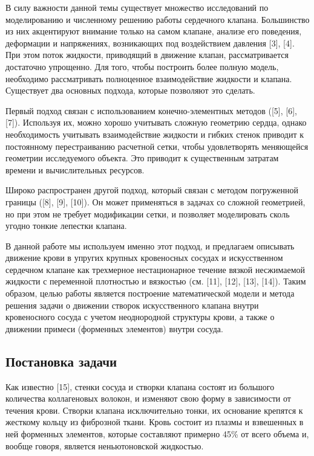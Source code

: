 В силу важности данной темы существует множество исследований по
моделированию и численному решению работы сердечного клапана.
Большинство из них акцентируют внимание только на самом клапане, анализе
его поведения, деформации и напряжениях, возникающих под воздействием
давления {[}3{]}, {[}4{]}. При этом поток жидкости, приводящий в
движение клапан, рассматривается достаточно упрощенно. Для того, чтобы
построить более полную модель, необходимо рассматривать полноценное
взаимодействие жидкости и клапана. Существует два основных подхода,
которые позволяют это сделать.

Первый подход связан с использованием конечно-элементных методов
({[}5{]}, {[}6{]}, {[}7{]}). Используя их, можно хорошо учитывать
сложную геометрию сердца, однако необходимость учитывать взаимодействие
жидкости и гибких стенок приводит к постоянному перестраиванию расчетной
сетки, чтобы удовлетворять меняющейся геометрии исследуемого объекта.
Это приводит к существенным затратам времени и вычислительных ресурсов.

Широко распространен другой подход, который связан с методом погруженной
границы ({[}8{]}, {[}9{]}, {[}10{]}). Он может применяться в задачах со
сложной геометрией, но при этом не требует модификации сетки, и
позволяет моделировать сколь угодно тонкие лепестки клапана.

В данной работе мы используем именно этот подход, и предлагаем описывать
движение крови в упругих крупных кровеносных сосудах и искусственном
сердечном клапане как трехмерное нестационарное течение вязкой
несжимаемой жидкости с переменной плотностью и вязкостью (см. {[}11{]},
{[}12{]}, {[}13{]}, {[}14{]}). Таким образом, целью работы является
построение математической модели и метода решения задачи о движении
створок искусственного клапана внутри кровеносного сосуда с учетом
неоднородной структуры крови, а также о движении примеси (форменных
элементов) внутри сосуда.

\subsection{Постановка
задачи}\label{ux43fux43eux441ux442ux430ux43dux43eux432ux43aux430-ux437ux430ux434ux430ux447ux438}

Как известно {[}15{]}, стенки сосуда и створки клапана состоят из
большого количества коллагеновых волокон, и изменяют свою форму в
зависимости от течения крови. Створки клапана исключительно тонки, их
основание крепятся к жесткому кольцу из фиброзной ткани. Кровь состоит
из плазмы и взвешенных в ней форменных элементов, которые составляют
примерно 45\% от всего объема и, вообще говоря, является неньютоновской
жидкостью.

